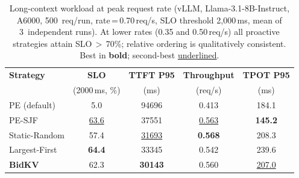 \begin{table}[t]
\centering
\caption{Long-context workload at peak request rate
  (vLLM, Llama-3.1-8B-Instruct, A6000, 500~req/run,
  rate\,=\,0.70\,req/s, SLO threshold 2{,}000\,ms,
  mean of 3~independent runs).
  At lower rates (0.35 and 0.50\,req/s) all proactive strategies
  attain SLO\,$>$\,70\%; relative ordering is qualitatively consistent.
  Best in \textbf{bold}; second-best \underline{underlined}.}
\label{tab:long_context}
\footnotesize
\begin{tabular}{@{}l c c c c@{}}
\toprule
\textbf{Strategy} & \textbf{SLO}
  & \textbf{TTFT P95} & \textbf{Throughput} & \textbf{TPOT P95} \\
  & (2000\,ms, \%) & (ms) & (req/s) & (ms) \\
\midrule
PE (default)      &  5.0 & 94696 & 0.413 & 184.1 \\
PE-SJF            & \underline{63.6} & 37551 & \underline{0.563} & \textbf{145.2} \\
Static-Random     & 57.4 & \underline{31693} & \textbf{0.568} & 208.3 \\
Largest-First     & \textbf{64.4} & 33345 & 0.542 & 239.6 \\
\textbf{BidKV}    & 62.3 & \textbf{30143} & 0.560 & \underline{207.0} \\
\bottomrule
\end{tabular}
\end{table}
